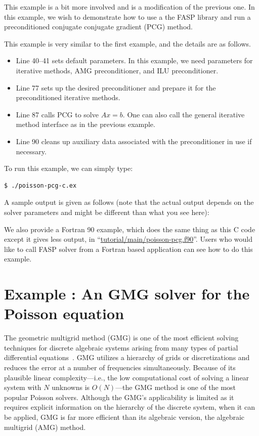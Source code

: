 \documentclass[11pt]{memoir}
\begin{document}
This example is a bit more involved and is a modification of the
previous one. In this example, we wish to demonstrate how to use a the
FASP library and run a preconditioned conjugate conjugate gradient (PCG) method.
%

%
This example is very similar to the first example, and the details are
as follows. 
\begin{itemize}
%
\item Line 40--41 sets default parameters. In this example, we need parameters for iterative methods, AMG preconditioner, and ILU preconditioner. 
%
\item Line 77 sets up the desired preconditioner and prepare it for the preconditioned iterative methods.
%
\item Line 87 calls PCG to solve $Ax=b$. One can also call the general iterative method interface as in the previous example.
%
\item Line 90 cleans up auxiliary data associated with the preconditioner in use if necessary. 
%
\end{itemize}
%
To run this example, we can simply type:
%
\begin{lstlisting}[numbers=none]
$ ./poisson-pcg-c.ex
\end{lstlisting}
%
A sample output is given as follows (note that the actual output depends on the solver parameters and might be different than what you see here):


We also provide a Fortran 90 example, which does the same thing as
this C code except it gives less output, in
``\url{tutorial/main/poisson-pcg.f90}''. Users who would like to call
FASP solver from a Fortran based application can see how to do this example.
%

%

\section{Example : An GMG solver for the Poisson equation}\label{sec:ex4}
\addtocounter{ex}{1}

The geometric multigrid method (GMG) is one of the most efficient solving techniques for discrete algebraic systems arising from many types of partial differential equations~\cite{Bramble.Bramble.1993fk,Trottenberg.TrottenbergOosterlee.2001fu}. GMG utilizes a hierarchy of grids or discretizations and reduces the error at a number of frequencies simultaneously. Because of its plausible linear complexity---i.e., the low computational cost of solving a linear system with $N$ unknowns is $O(N)$---the GMG method is one of the most popular Poisson solvers. Although the GMG's applicability is limited as it requires explicit information on the hierarchy of the discrete system, when it can be applied, GMG is far more efficient than its algebraic version, the algebraic multigrid (AMG) method.
\end{document}
